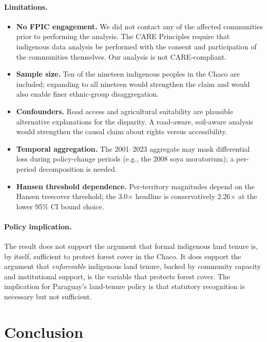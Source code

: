 \paragraph{Limitations.}
\begin{itemize}
    \item \textbf{No FPIC engagement.} We did not contact any of the
    affected communities prior to performing the analysis. The CARE
    Principles \citep{carroll2020care} require that indigenous data
    analysis be performed with the consent and participation of the
    communities themselves. Our analysis is not CARE-compliant.
    \item \textbf{Sample size.} Ten of the nineteen indigenous peoples
    in the Chaco are included; expanding to all nineteen would
    strengthen the claim and would also enable finer ethnic-group
    disaggregation.
    \item \textbf{Confounders.} Road access and agricultural
    suitability are plausible alternative explanations for the
    disparity. A road-aware, soil-aware analysis would strengthen the
    causal claim about rights versus accessibility.
    \item \textbf{Temporal aggregation.} The 2001--2023 aggregate
    may mask differential loss during policy-change periods
    (e.g., the 2008 soya moratorium); a per-period decomposition is
    needed.
    \item \textbf{Hansen threshold dependence.} Per-territory
    magnitudes depend on the Hansen treecover threshold; the 3.0$\times$
    headline is conservatively 2.26$\times$ at the lower 95\% CI bound
    choice.
\end{itemize}

\paragraph{Policy implication.} The result does not support the
argument that formal indigenous land tenure is, by itself, sufficient
to protect forest cover in the Chaco. It does support the argument
that \emph{enforceable} indigenous land tenure, backed by community
capacity and institutional support, is the variable that protects
forest cover. The implication for Paraguay's land-tenure policy is
that statutory recognition is necessary but not sufficient.

\section{Conclusion}
\label{sec:yvy-conclusion}

